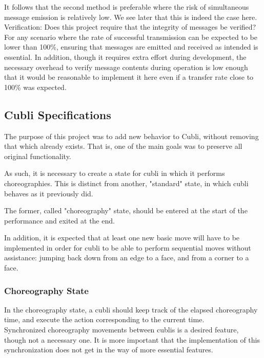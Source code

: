 It follows that the second method is preferable where the risk of simultaneous message emission is relatively low. We see later that this is indeed the case here. \\


Verification: Does this project require that the integrity of messages be verified? For any scenario where the rate of successful transmission can be expected to be lower than 100\%, ensuring that messages are emitted and received as intended is essential. In addition, though it requires extra effort during development, the necessary overhead to verify message contents during operation is low enough that it would be reasonable to implement it here even if a transfer rate close to 100\% was expected.


\subsection{Cubli Specifications}

The purpose of this project was to add new behavior to Cubli, without removing that which already exists. That is, one of the main goals was to preserve all original functionality.

As such, it is necessary to create a state for cubli in which it performs choreographies. This is distinct from another, "standard" state, in which cubli behaves as it previously did.

The former, called "choreography" state, should be entered at the start of the performance and exited at the end.

In addition, it is expected that at least one new basic move will have to be implemented in order for cubli to be able to perform sequential moves without assistance: jumping back down from an edge to a face, and from a corner to a face.

\subsubsection{Choreography State}

In the choreography state, a cubli should keep track of the elapsed choreography time, and execute the action corresponding to the current time.\\

Synchronized choreography movements between cublis is a desired feature, though not a necessary one. It is more important that the implementation of this synchronization does not get in the way of more essential features.\\

